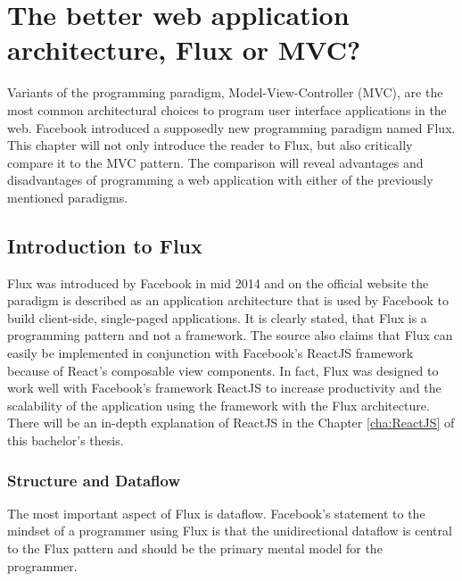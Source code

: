 \chapter{The better web application architecture, Flux or MVC?}
\label{cha:fluxreduxmvc}

Variants of the programming paradigm, Model-View-Controller (MVC), are the most common architectural choices to program user interface applications in the web. Facebook introduced a supposedly new programming paradigm named Flux. This chapter will not only introduce the reader to Flux, but also critically compare it to the MVC pattern. The comparison will reveal advantages and disadvantages of programming a web application with either of the previously mentioned paradigms.


\section{Introduction to Flux}

Flux was introduced by Facebook in mid 2014 and on the official website \cite{FacebookInc.2014} the paradigm is described as an application architecture that is used by Facebook to build client-side, single-paged applications. It is clearly stated, that Flux is a programming pattern and not a framework. The source also claims that Flux can easily be implemented in conjunction with Facebook's ReactJS framework because of React's composable view components. In fact, Flux was designed to work well with Facebook's framework ReactJS to increase productivity and the scalability of the application using the framework with the Flux architecture. There will be an in-depth explanation of ReactJS in the Chapter \ref{cha:ReactJS} of this bachelor's thesis.

\subsection{Structure and Dataflow}

The most important aspect of Flux is dataflow. Facebook's statement to the mindset of a programmer using Flux \cite[structure-and-data-flow]{FacebookInc.2014} is that the unidirectional dataflow is central to the Flux pattern and should be the primary mental model for the programmer. 

